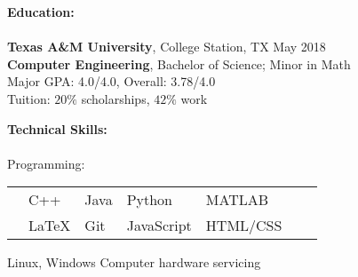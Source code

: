 \documentclass[12pt]{article}
\begin{document}
\begin{flushleft}
\begin{outline}[compactitem]

\newlength{\upspacelength}
\setlength{\upspacelength}{0px}
\newcommand{\upspace}{\vspace{\upspacelength}}
\newcommand{\zzz}[1]{\upspace \0 \textbf{#1} \\ \vspace{-0.8\baselineskip} \hrulefill \vspace{-2px} \\ }
\let\oldOne\1\let\oldTwo\2\let\oldThree\3\let\oldFour\4
\renewcommand{\1}{\upspace \oldOne  }
\renewcommand{\2}{\upspace \oldTwo  }
\renewcommand{\3}{\upspace \oldThree}
\renewcommand{\4}{\upspace \oldFour }

\zzz{Education:}
  \1 \textbf{Texas A\&M University}, College Station, TX \hfill May 2018
  \\ \textbf{Computer Engineering}, Bachelor of Science; Minor in Math
  \\ Major GPA: 4.0/4.0, Overall: 3.78/4.0
  \\ Tuition: $20\%$ scholarships, $42\%$ work

\zzz{Technical Skills:}
  \1 Programming:
    \\
    \vspace{-\baselineskip}\vspace{-\upspacelength}
    \begin{tabularx}{\textwidth}{X X X X X X X}
      & C++   & Java & Python     & MATLAB   \upspace \\
      & LaTeX & Git  & JavaScript & HTML/CSS \upspace \\
    \end{tabularx}
    \vspace{-5px}\upspace
  \1 
    Linux, Windows
    \hfill{}\hspace{1px}
    Computer hardware servicing
    \hfill\hfill


\end{outline}
\end{flushleft}
\end{document}
